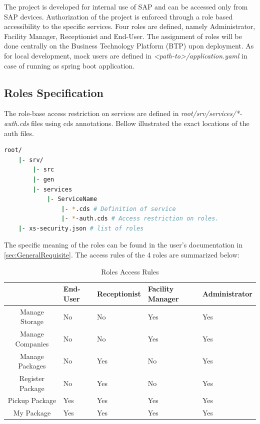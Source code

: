 The project is developed for internal use of SAP and can be accessed only from SAP devices. 
Authorization of the project is enforced through a role based accessibility to the specific services. Four roles are defined, namely Administrator, Facility Manager, Receptionist and End-User. The assignment of roles will be done centrally on the Business Technology Platform (BTP) upon deployment. As for local development, mock users are defined in \textit{<path-to>/application.yaml} in case of running as spring boot \cite{springboot-doc} application.

\subsection{Roles Specification}
The role-base access restriction on services are defined in \textit{root/srv/services/*-auth.cds} files using cds annotations. Bellow illustrated the exact locations of the auth files.

\begin{lstlisting}[language={bash}]
root/
    |- srv/
        |- src
        |- gen
        |- services
            |- ServiceName 
                |- *.cds # Definition of service
                |- *-auth.cds # Access restriction on roles.
    |- xs-security.json # list of roles
\end{lstlisting}

The specific meaning of the roles can be found in the user's documentation in \autoref{sec:GeneralRequisite}. The access rules of the 4 roles are summarized below:

\begin{table}[H]
    \centering
    \begin{tabular}{|c|m{2.1cm}|m{2.1cm}|m{2.1cm}|m{2.5cm}|} \hline 
         & End-User & Receptionist & Facility Manager & Administrator     \\ \hline 
         Manage Storage          & No & No & Yes & Yes \\ \hline 
         Manage Companies         & No & No & Yes & Yes \\ \hline 
         Manage Packages          & No & Yes & No  & Yes \\ \hline 
         Register Package       & No & Yes & No  & Yes \\ \hline 
         Pickup Package           & Yes & Yes & Yes & Yes \\ \hline
         My Package               & Yes & Yes & Yes & Yes \\ \hline
    \end{tabular}
    \caption{Roles Access Rules}
    \label{tab:Access Rule}
\end{table}
